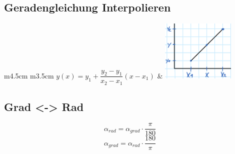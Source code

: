 


\begin{minipage}{13cm}
	
	
\end{minipage}
\begin{minipage}{5cm}
	
\end{minipage}
\begin{multicols}{2}
	
	\columnbreak
	
	
\end{multicols}
\begin{multicols}{2}
	
	
	\columnbreak
	
	
\end{multicols}

\begin{minipage}{0.5\linewidth}
    \subsection{Geradengleichung Interpolieren}
    \begin{tabular}{m{4.5cm} m{3.5cm}}
       $ y(x)=y_1 + \dfrac{y_2 - y_1}{x_2 - x_1}(x-x_1) $ & 
       \includegraphics[width=3.5cm]{idiotenseite/images/interpolieren}\\      
    \end{tabular}         
\end{minipage}
\begin{minipage}{0.4\linewidth}
    \subsection{Grad <-> Rad}
    \[ \alpha_{rad}=\alpha_{grad}\cdot\dfrac{\pi}{180} \]
    \[ \alpha_{grad}=\alpha_{rad}\cdot\dfrac{180}{\pi} \]
\end{minipage}